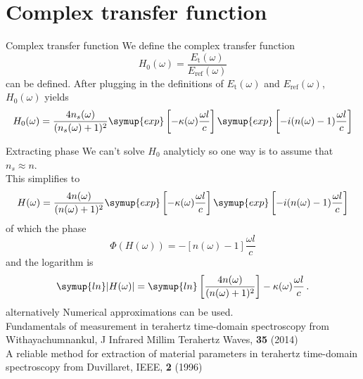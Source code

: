 \documentclass[aspectratio=1610, 9pt]{beamer}
\begin{document}
\section{Complex transfer function}
\begin{frame}{Complex transfer function}
  We define the complex transfer function 
  \begin{equation}
    H_0(\omega) = \frac{E_\text{t}(\omega)}{E_\text{ref}(\omega)}
  \end{equation}
  can be defined.
  After plugging in the definitions of $E_\text{t}(\omega)$ and $E_\text{ref}(\omega)$, $H_0(\omega)$ yields
  \begin{equation}
    H_0 (\omega) = \frac{4 n_s(\omega)}{(n_s(\omega) +1)^2} \symup{exp}\left[-\kappa(\omega) \frac{\omega l }{c}\right] \symup{exp}\left[-i (n (\omega) - 1) \frac{\omega l}{c}\right]
  \end{equation}
  \end{frame}

\begin{frame}{Extracting phase}
  We can't solve $H_0$ analyticly so one way is to assume that $n_s \approx n$.\\
  This simplifies to 
  \begin{equation}
    H(\omega) = \frac{4n(\omega)}{(n(\omega) + 1)^2} \symup{exp}\left[-\kappa(\omega) \frac{\omega l }{c}\right] \symup{exp}\left[- i(n(\omega) - 1) \frac{\omega l}{c}\right]
\end{equation}
  of which the phase
  \begin{equation}
    \Phi(H(\omega)) = -[n(\omega) - 1] \frac{\omega l}{c}
\end{equation}
and the logarithm is
\begin{equation}
    \symup{ln}|H(\omega)| = \symup{ln}\left[ \frac{4n(\omega)}{(n(\omega) +1)^2}\right] - \kappa(\omega) \frac{\omega l}{c} \, .
\end{equation}
alternatively Numerical approximations can be used.\\
\textcolor{tugreen}{Fundamentals of measurement in terahertz time-domain spectroscopy} from Withayachumnankul, J Infrared Millim Terahertz Waves, \textbf{35} (2014)\\
\textcolor{tugreen}{A reliable method for extraction of material parameters in terahertz time-domain spectroscopy} from Duvillaret, IEEE, \textbf{2} (1996)
\end{frame}
\end{document}
